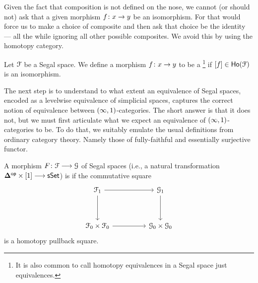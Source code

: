 \medskip

Given the fact that composition is not defined on the nose, we cannot (or should not) ask that a given morphism $f\colon x \rightarrow y$ be an isomorphism. For that would force us to make a choice of composite and then ask that choice be the identity —  all the while ignoring all other possible composites. We avoid this by using the homotopy category.

\begin{definition}\label{ch2:: def: hom eq}
Let $\mathcal F$ be a Segal space. We define a morphism $f\colon x \rightarrow y$ to be a \footnote{It is also common to call homotopy equivalences in a Segal space just equivalences.} if $[f]\in \operatorname{\sf Ho}(\mathcal F)$ is an isomorphism.
\end{definition}

The next step is to understand to what extent an equivalence of Segal spaces, encoded as a levelwise equivalence of simplicial spaces, captures the correct notion of equivalence between $(\operatorname{\infty},1)$-categories. The short answer is that it does not, but we must first articulate what we expect an equivalence of $(\operatorname{\infty},1)$-categories to be. To do that, we suitably emulate the usual definitions from ordinary category theory. Namely those of fully-faithful and essentially surjective functor.

\begin{definition}
    A morphism $F\colon \mathcal F \longrightarrow \mathcal G$ of Segal spaces (i.e., a natural transformation $\mathbf\Delta^{\mathsf{op}}\times [1] \longrightarrow \operatorname{\sf sSet}$) is  if the commutative square 
    \[\begin{tikzcd}[ampersand replacement=\&]
        {\cF_1} \&\& {\cG_1} \\
        \\
        {\cF_0\times \cF_0} \&\& {\cG_0 \times \cG_0}
        \arrow[from=1-1, to=1-3]
        \arrow[from=1-1, to=3-1]
        \arrow[from=1-3, to=3-3]
        \arrow[from=3-1, to=3-3]
    \end{tikzcd}\]
    is a homotopy pullback square.
\end{definition}

